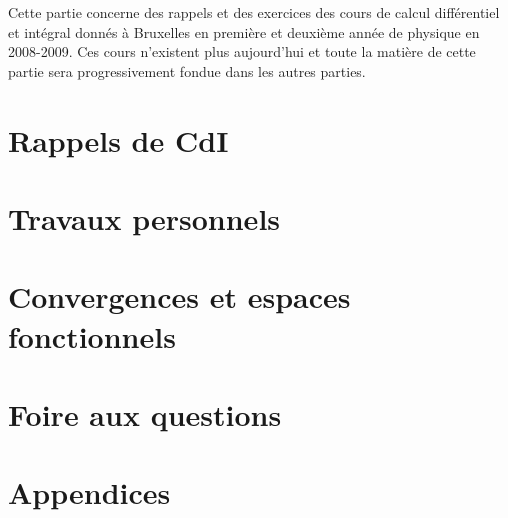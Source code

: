 Cette partie concerne des rappels et des exercices des cours de calcul différentiel et intégral donnés à Bruxelles en première et deuxième année de physique en 2008-2009. Ces cours n'existent plus aujourd'hui et toute la matière de cette partie sera progressivement fondue dans les autres parties.

\chapter{Rappels de CdI}



\chapter{Travaux personnels}




\chapter{Convergences et espaces fonctionnels}
	

\chapter{Foire aux questions}
	
\chapter{Appendices}

